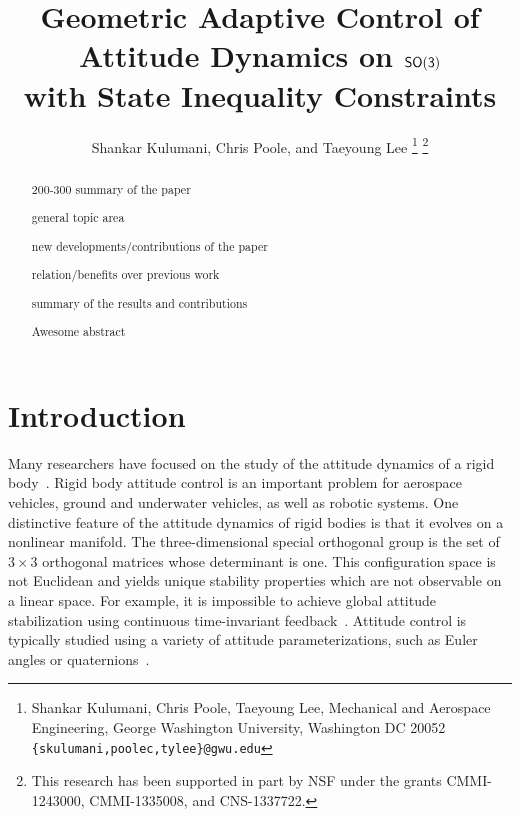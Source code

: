 \documentclass[letterpaper, 10 pt, conference]{ieeeconf}  %
\title{\LARGE \bf
Geometric Adaptive Control of Attitude Dynamics on $\mathsf{SO(3)}$\\ with State Inequality Constraints}
\author{Shankar Kulumani, Chris Poole, and Taeyoung Lee
\thanks{Shankar Kulumani, Chris Poole, Taeyoung Lee, Mechanical and Aerospace Engineering, George Washington University, Washington DC 20052 {\tt \{skulumani,poolec,tylee\}@gwu.edu}}
\thanks{This research has been supported in part by NSF under the grants CMMI-1243000, CMMI-1335008, and CNS-1337722.}
}
\begin{document}
\maketitle
\thispagestyle{empty}
\pagestyle{empty}


\begin{abstract}

200-300 summary of the paper

general topic area

new developments/contributions of the paper

relation/benefits over previous work

summary of the results and contributions

Awesome abstract

\end{abstract}


\section{Introduction}\label{sec:intro}
Many researchers have focused on the study of the attitude dynamics of a rigid body~\cite{hughes2004,wertz1978}.
Rigid body attitude control is an important problem for aerospace vehicles, ground and underwater vehicles, as well as robotic systems.
One distinctive feature of the attitude dynamics of rigid bodies is that it evolves on a nonlinear manifold.
The three-dimensional special orthogonal group is the set of \( 3 \times 3 \) orthogonal matrices whose determinant is one.
This configuration space is not Euclidean and yields unique stability properties which are not observable on a linear space.
For example, it is impossible to achieve global attitude stabilization using continuous time-invariant feedback~\cite{bhat2000}.
Attitude control is typically studied using a variety of attitude parameterizations, such as Euler angles or quaternions~\cite{shuster1993}.

\end{document}
